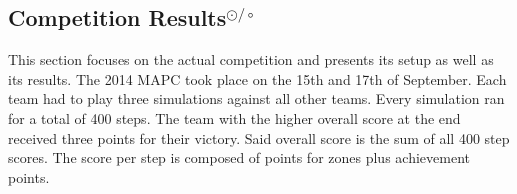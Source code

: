 \subsection[Competition Results]{Competition Results$^{\odot/\circ}$}\label{con:competition}
This section focuses on the actual competition and presents its setup as well as its results.
The 2014 MAPC took place on the 15th and 17th of September.
Each team had to play three simulations against all other teams.
Every simulation ran for a total of 400 steps.
The team with the higher overall score at the end received three points for their victory.
Said overall score is the sum of all 400 step scores.
The score per step is composed of points for zones plus achievement points.

